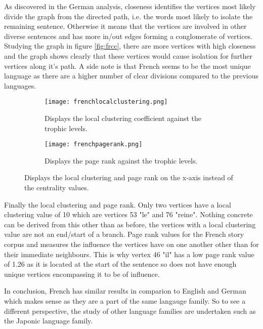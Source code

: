 As discovered in the German analysis, closeness identifies the vertices most likely divide the graph from the directed path, i.e. the words most likely to isolate the remaining sentence. Otherwise it means that the vertices are involved in other diverse sentences and has more in/out edges forming a conglomerate of vertices. Studying the graph in figure \ref{fig:frcc}, there are more vertices with high closeness and the graph shows clearly that these vertices would cause isolation for further vertices along it's path. A side note is that French seems to be the most unique language as there are a higher number of clear divisions compared to the previous languages. 

\begin{figure}[H]
\centering
\begin{subfigure}{.45\textwidth}
	\hspace{-1cm} 
	\texttt{[image: frenchlocalclustering.png]}
	\caption{Displays the local clustering coefficient against the trophic levels.}
	\label{fig:frlc}
\end{subfigure}
\hfill
\begin{subfigure}{.45\textwidth}
	\hspace{-1cm} 
	\texttt{[image: frenchpagerank.png]}
	\caption{Displays the page rank against the trophic levels.}
	\label{fig:frpr}
\end{subfigure}
\caption{Displays the local clustering and page rank on the x-axis instead of the centrality values.}
\label{fig:frother}
\end{figure}

Finally the local clustering and page rank. Only two vertices have a local clustering value of 10 which are vertices 53 "le" and 76 "reine". Nothing concrete can be derived from this other than as before, the vertices with a local clustering value are not an end/start of a branch. Page rank values for the French story corpus and measures the influence the vertices have on one another other than for their immediate neighbours. This is why vertex 46 "il" has a low page rank value of 1.26 as it is located at the start of the sentence so does not have enough unique vertices encompassing it to be of influence.

In conclusion, French has similar results in comparion to English and German which makes sense as they are a part of the same langauge family. So to see a different perspective, the study of other language families are undertaken such as the Japonic language family.

